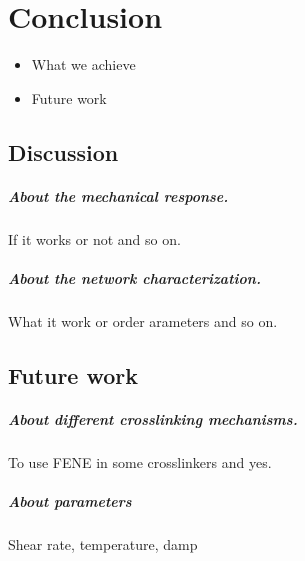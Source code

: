 \chapter{Conclusion}\label{ch4:Conclusion}


\begin{itemize}
    \item What we achieve
    \item Future work
\end{itemize}

\section{Discussion}

\paragraph{About the mechanical response.} If it works or not and so on.

\paragraph{About the network characterization.} What it work or order arameters and so on.

\section{Future work}

\paragraph{About different crosslinking mechanisms.} To use FENE in some crosslinkers and yes.

\paragraph{About parameters} Shear rate, temperature, damp

\newpage
